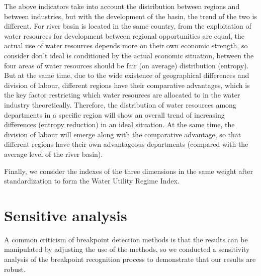 \documentclass[9pt,twoside,lineno]{pnas-new}
\begin{document}
    The above indicators take into account the distribution between regions and between industries, but with the development of the basin, the trend of the two is different. For river basin is located in the same country, from the exploitation of water resources for development between regional opportunities are equal, the actual use of water resources depends more on their own economic strength, so consider don't ideal is conditioned by the actual economic situation, between the four areas of water resources should be fair (on average) distribution (entropy). But at the same time, due to the wide existence of geographical differences and division of labour, different regions have their comparative advantages, which is the key factor restricting which water resources are allocated to in the water industry theoretically. Therefore, the distribution of water resources among departments in a specific region will show an overall trend of increasing differences (entropy reduction) in an ideal situation. At the same time, the division of labour will emerge along with the comparative advantage, so that different regions have their own advantageous departments (compared with the average level of the river basin).

Finally, we consider the indexes of the three dimensions in the same weight after standardization to form the Water Utility Regime Index.


\section*{Sensitive analysis}
A common criticism of breakpoint detection methods is that the results can be manipulated by adjusting the use of the methods, so we conducted a sensitivity analysis of the breakpoint recognition process to demonstrate that our results are robust. 
\end{document}
